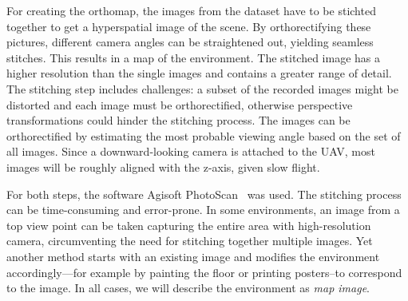 For creating the orthomap, the images from the dataset have to be stichted
together to get a hyperspatial image of the scene. By orthorectifying
these pictures, different camera angles can be straightened out,
yielding seamless stitches. This results in a map of the
environment. The stitched image has a higher resolution than the
single images and contains a greater range of detail. The stitching
step includes challenges: a subset of the recorded images might be
distorted and each image must be orthorectified, otherwise perspective
transformations could hinder the stitching process. The images can be
orthorectified by estimating the most probable viewing angle based on
the set of all images. Since a downward-looking camera is attached to
the UAV, most images will be roughly aligned with the z-axis, given
slow flight.

For both steps, the software Agisoft
PhotoScan~\cite{agisoft2013agisoft} was used. The stitching process
can be time-consuming and error-prone. In some environments, an image
from a top view point can be taken capturing the entire area with
high-resolution camera, circumventing the need for stitching together
multiple images. Yet another method starts with an existing image and
modifies the environment accordingly---for example by painting the
floor or printing posters--to correspond to the image. In all cases,
we will describe the environment as \emph{map image}. 